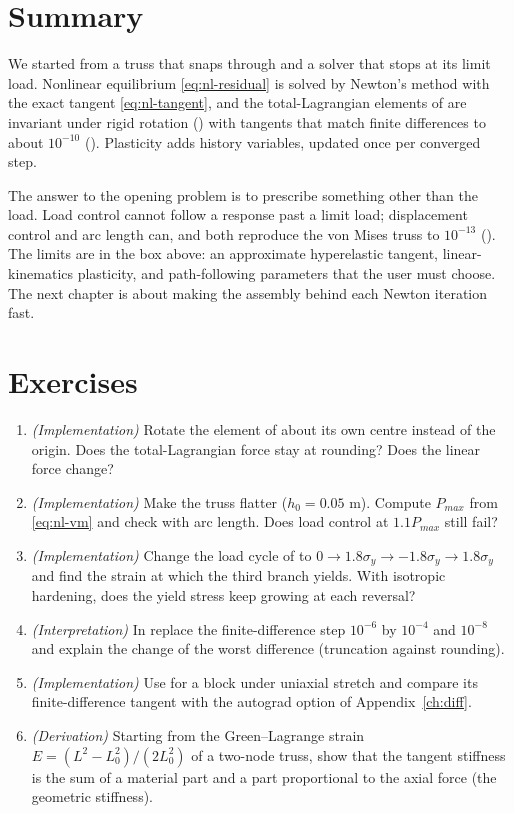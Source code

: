\section{Summary}\label{sec:nl-summary}

We started from a truss that snaps through and a solver that stops at its limit load. Nonlinear equilibrium \eqref{eq:nl-residual} is solved by Newton's method with the exact tangent \eqref{eq:nl-tangent}, and the total-Lagrangian elements of \fea{} are invariant under rigid rotation () with tangents that match finite differences to about $10^{-10}$ (). Plasticity adds history variables, updated once per converged step.

The answer to the opening problem is to prescribe something other than the load. Load control cannot follow a response past a limit load; displacement control and arc length can, and both reproduce the von Mises truss to $10^{-13}$ (). The limits are in the box above: an approximate hyperelastic tangent, linear-kinematics plasticity, and path-following parameters that the user must choose. The next chapter is about making the assembly behind each Newton iteration fast.

\section*{Exercises}\label{sec:nl-exercises}
\begin{enumerate}
\item \emph{(Implementation)} Rotate the element of  about its own centre instead of the origin. Does the total-Lagrangian force stay at rounding? Does the linear force change?
\item \emph{(Implementation)} Make the truss flatter ($h_0=0.05$ m). Compute $P_{max}$ from \eqref{eq:nl-vm} and check with arc length. Does load control at $1.1P_{max}$ still fail?
\item \emph{(Implementation)} Change the load cycle of  to $0\to1.8\sigma_y\to-1.8\sigma_y\to1.8\sigma_y$ and find the strain at which the third branch yields. With isotropic hardening, does the yield stress keep growing at each reversal?
\item \emph{(Interpretation)} In  replace the finite-difference step $10^{-6}$ by $10^{-4}$ and $10^{-8}$ and explain the change of the worst difference (truncation against rounding).
\item \emph{(Implementation)} Use  for a block under uniaxial stretch and compare its finite-difference tangent with the autograd option of Appendix~\ref{ch:diff}.
\item \emph{(Derivation)} Starting from the Green--Lagrange strain $E=(L^2-L_0^2)/(2L_0^2)$ of a two-node truss, show that the tangent stiffness is the sum of a material part and a part proportional to the axial force (the geometric stiffness).
\end{enumerate}

\chapterrefs
